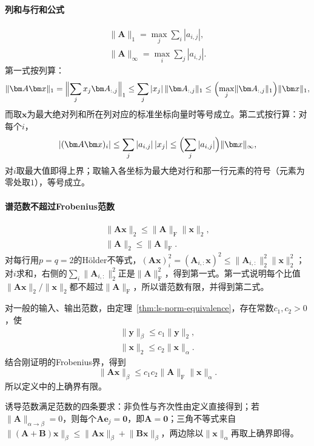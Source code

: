 \paragraph{列和与行和公式}
\[
 \begin{gathered}
 \lVert\bm A\rVert_1=\max_j\sum_i|a_{i,j}|,\\
 \lVert\bm A\rVert_\infty=\max_i\sum_j|a_{i,j}|.
 \end{gathered}
\]
第一式按列算：
\[
 \lVert\bm A\bm x\rVert_1=\Bigl\lVert\sum_jx_j\bm A_{:,j}\Bigr\rVert_1\leq\sum_j|x_j|\,\lVert\bm A_{:,j}\rVert_1\leq\Bigl(\max_j\lVert\bm A_{:,j}\rVert_1\Bigr)\lVert\bm x\rVert_1,
\]
而取$\bm x$为最大绝对列和所在列对应的标准坐标向量时等号成立。第二式按行算：对每个$i$，
\[
 |(\bm A\bm x)_i|\leq\sum_j|a_{i,j}|\,|x_j|\leq\Bigl(\sum_j|a_{i,j}|\Bigr)\lVert\bm x\rVert_\infty,
\]
对$i$取最大值即得上界；取输入各坐标为最大绝对行和那一行元素的符号（元素为零处取$1$），等号成立。

\paragraph{谱范数不超过Frobenius范数}
\[
 \begin{gathered}
 \lVert\bm A\bm x\rVert_2\leq\lVert\bm A\rVert_{\mathrm F}\lVert\bm x\rVert_2,\\
 \lVert\bm A\rVert_2\leq\lVert\bm A\rVert_{\mathrm F}.
 \end{gathered}
\]
对每行用$p=q=2$的Hölder不等式，$(\bm A\bm x)_i^2=(\bm A_{i,:}\bm x)^2\leq\lVert\bm A_{i,:}\rVert_2^2\lVert\bm x\rVert_2^2$；对$i$求和，右侧的$\sum_i\lVert\bm A_{i,:}\rVert_2^2$正是$\lVert\bm A\rVert_{\mathrm F}^2$，得到第一式。第一式说明每个比值$\lVert\bm A\bm x\rVert_2/\lVert\bm x\rVert_2$都不超过$\lVert\bm A\rVert_{\mathrm F}$，所以谱范数有限，并得到第二式。

对一般的输入、输出范数，由定理~\ref{thm:ls-norm-equivalence}，存在常数$c_1,c_2>0$，使
\[
 \begin{gathered}
 \lVert\bm y\rVert_\beta\leq c_1\lVert\bm y\rVert_2,\\
 \lVert\bm x\rVert_2\leq c_2\lVert\bm x\rVert_\alpha.
 \end{gathered}
\]
结合刚证明的Frobenius界，得到
\[
 \lVert\bm A\bm x\rVert_\beta
 \leq c_1c_2\lVert\bm A\rVert_{\mathrm F}\lVert\bm x\rVert_\alpha.
\]
所以定义中的上确界有限。

诱导范数满足范数的四条要求：非负性与齐次性由定义直接得到；若$\lVert\bm A\rVert_{\alpha\to\beta}=0$，则每个$\bm A\bm e_j=\bm0$，即$\bm A=\bm0$；三角不等式来自$\lVert(\bm A+\bm B)\bm x\rVert_\beta\leq\lVert\bm A\bm x\rVert_\beta+\lVert\bm B\bm x\rVert_\beta$，两边除以$\lVert\bm x\rVert_\alpha$再取上确界即得。

